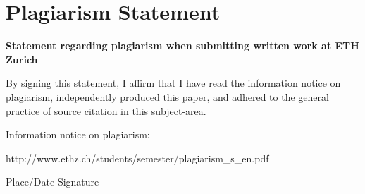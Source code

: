 \chapter*{Plagiarism Statement}

\textbf{Statement regarding plagiarism when submitting written work at ETH Zurich}

By signing this statement, I affirm that I have read the information notice on plagiarism, independently produced this paper, and adhered to the general practice of source citation in this subject-area.

\vspace{1cm}

Information notice on plagiarism:

http://www.ethz.ch/students/semester/plagiarism\_s\_en.pdf



\vspace{4cm}

\makebox[1.5in]{\hrulefill} \hspace{0.5cm} \makebox[3in]{\hrulefill}


Place/Date \hspace{2.7cm} Signature